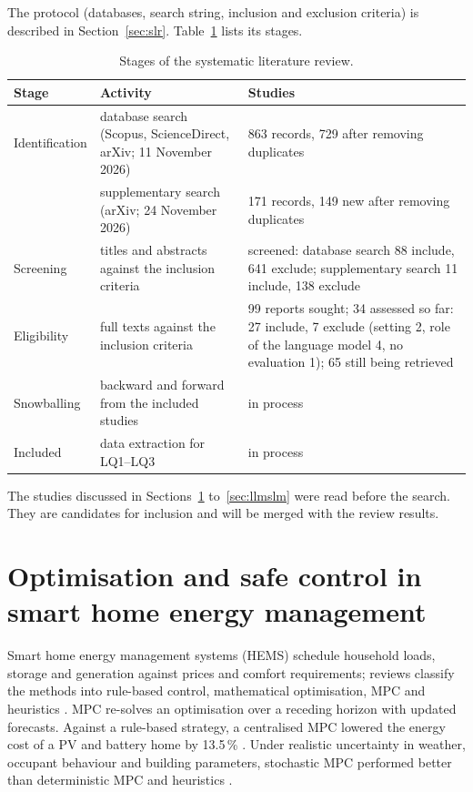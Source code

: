 The protocol (databases, search string, inclusion and exclusion
criteria) is described in Section~\ref{sec:slr}. Table~\ref{tab:slrstages}
lists its stages.

\begin{table}[htbp]
\caption{Stages of the systematic literature review.}
\label{tab:slrstages}
\small
\begin{tabularx}{\textwidth}{@{}p{2.3cm}XX@{}}
\toprule
Stage & Activity & Studies \\
\midrule
Identification & database search (Scopus, ScienceDirect, arXiv; 11 November 2026) & 863 records, 729 after removing duplicates \\
 & supplementary search (arXiv; 24 November 2026) & 171 records, 149 new after removing duplicates \\
Screening & titles and abstracts against the inclusion criteria & screened: database search 88 include, 641 exclude; supplementary search 11 include, 138 exclude \\
Eligibility & full texts against the inclusion criteria & 99 reports sought; 34 assessed so far: 27 include, 7 exclude (setting 2, role of the language model 4, no evaluation 1); 65 still being retrieved \\
Snowballing & backward and forward from the included studies & in process \\
Included & data extraction for LQ1--LQ3 & in process \\
\bottomrule
\end{tabularx}
\end{table}

The studies discussed in Sections~\ref{sec:lithems} to~\ref{sec:llmslm}
were read before the search. They are candidates for inclusion and will
be merged with the review results.

\section{Optimisation and safe control in smart home energy management}
\label{sec:lithems}

Smart home energy management systems (HEMS) schedule household loads, storage
and generation against prices and comfort requirements; reviews classify
the methods into rule-based control, mathematical optimisation, MPC and
heuristics \parencite{beaudin2015}. MPC re-solves an optimisation over a
receding horizon with updated forecasts. Against a rule-based strategy,
a centralised MPC lowered the energy cost of a PV and battery home by
13.5\,\% \parencite{seal2019}. Under realistic uncertainty in weather,
occupant behaviour and building parameters, stochastic MPC performed
better than deterministic MPC and heuristics \parencite{blonsky2022}.

